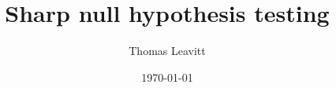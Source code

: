 \documentclass[table, xcolor = {dvipsnames}, 9pt]{beamer}
\title[]{Sharp null hypothesis testing} %
\author{Thomas Leavitt} %
\institute[] %
{
\medskip
\textit{} %
}
\date{\today} %
\theoremstyle{plain}
\begin{document}
\begin{frame}
\titlepage %
\end{frame}

\end{document}

